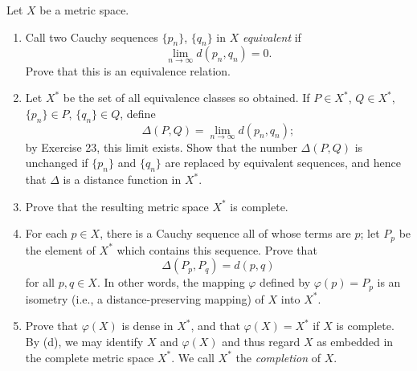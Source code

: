 \documentclass[main.tex]{subfiles}
\begin{document}
Let $X$ be a metric space.
\begin{enumerate}
  \item Call two Cauchy sequences $\{p_{n}\}$, $\{q_{n}\}$ in $X$ \textit{equivalent} if
  \[
  \lim_{n\to\infty} d(p_{n}, q_{n}) = 0.
  \]
  Prove that this is an equivalence relation.
  \item Let $X^{*}$ be the set of all equivalence classes so obtained. If $P \in X^{*}$, $Q \in X^{*}$, $\{p_{n}\} \in P$, $\{q_{n}\} \in Q$, define
  \[
  \Delta(P, Q) = \lim_{n\to\infty} d(p_{n}, q_{n});
  \]
  by Exercise 23, this limit exists. Show that the number $\Delta(P, Q)$ is unchanged if $\{p_{n}\}$ and $\{q_{n}\}$ are replaced by equivalent sequences, and hence that $\Delta$ is a distance function in $X^{*}$.
  \item Prove that the resulting metric space $X^{*}$ is complete.
  \item For each $p \in X$, there is a Cauchy sequence all of whose terms are $p$; let $P_{p}$ be the element of $X^{*}$ which contains this sequence. Prove that
  \[
  \Delta(P_{p}, P_{q}) = d(p, q)
  \]
  for all $p, q \in X$. In other words, the mapping $\varphi$ defined by $\varphi(p) = P_{p}$ is an isometry (i.e., a distance-preserving mapping) of $X$ into $X^{*}$.
  \item Prove that $\varphi(X)$ is dense in $X^{*}$, and that $\varphi(X) = X^{*}$ if $X$ is complete. By (d), we may identify $X$ and $\varphi(X)$ and thus regard $X$ as embedded in the complete metric space $X^{*}$. We call $X^{*}$ the \textit{completion} of $X$.
\end{enumerate}
\end{document}
